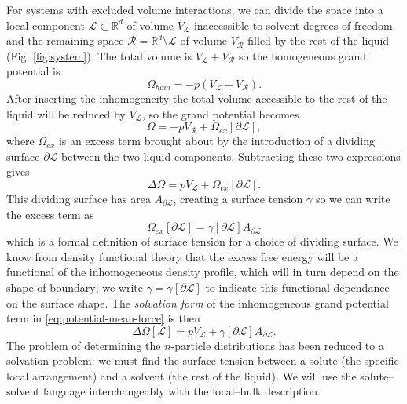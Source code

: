 \documentclass[11pt]{report}
\begin{document}
For systems with excluded volume interactions, we can divide the space into a local component $\mathcal{L} \subset \mathbb{R}^d$ of volume $V_\mathcal{L}$ inaccessible to solvent degrees of freedom and the remaining space $\mathcal{R} = \mathbb{R}^d \setminus \mathcal{L}$ of volume $V_\mathcal{R}$ filled by the rest of the liquid (Fig. \ref{fig:system}).
The total volume is $V_\mathcal{L} + V_\mathcal{R}$ so the homogeneous grand potential is
\begin{equation*}
  \Omega_{hom} = -p (V_\mathcal{L} + V_\mathcal{R}).
\end{equation*}
After inserting the inhomogeneity the total volume accessible to the rest of the liquid will be reduced by $V_\mathcal{L}$, so the grand potential becomes
\begin{equation*}
  \Omega = -p V_\mathcal{R} + \Omega_{ex}[\partial\mathcal{L}],
\end{equation*}
where $\Omega_{ex}$ is an excess term brought about by the introduction of a dividing surface $\partial\mathcal{L}$ between the two liquid components.
Subtracting these two expressions gives
\begin{equation*}
  \Delta \Omega = p V_\mathcal{L} + \Omega_{ex}[\partial\mathcal{L}].
\end{equation*}
This dividing surface has area $A_{\partial\mathcal{L}}$, creating a surface tension $\gamma$ so we can write the excess term as
\begin{equation*}
  \Omega_{ex}[\partial\mathcal{L}] =
  \gamma[\partial\mathcal{L}] A_{\partial\mathcal{L}}
\end{equation*}
which is a formal definition of surface tension for a choice of dividing surface.
We know from density functional theory that the excess free energy will be a functional of the inhomogeneous density profile, which will in turn depend on the shape of boundary; we write $\gamma = \gamma[\partial \mathcal{L}]$ to indicate this functional dependance on the surface shape.
The \emph{solvation form} of the inhomogeneous grand potential term in \eqref{eq:potential-mean-force} is then
\begin{equation}\label{eq:surface-tension}
  \Delta \Omega[\mathcal{L}] =
  p V_\mathcal{L} + \gamma[{\partial\mathcal{L}}] A_{\partial\mathcal{L}}.
\end{equation}
The problem of determining the $n$-particle distributions has been reduced to a solvation problem: we must find the surface tension between a solute (the specific local arrangement) and a solvent (the rest of the liquid).
We will use the solute--solvent language interchangeably with the local--bulk description.
\end{document}
